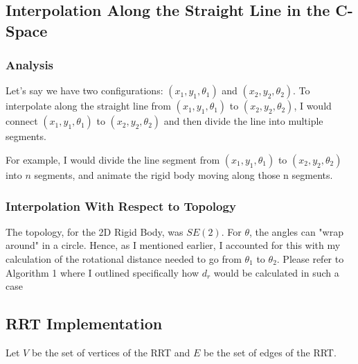 \documentclass{article}
\begin{document}
\subsection{Interpolation Along the Straight Line in the C-Space}
\subsubsection{Analysis}
Let's say we have two configurations: $(x_1, y_1, \theta_1)$ and $(x_2, y_2, \theta_2)$. To interpolate along the straight line from $(x_1, y_1, \theta_1)$ to  $(x_2, y_2, \theta_2)$, I would connect $(x_1, y_1, \theta_1)$ to  $(x_2, y_2, \theta_2)$ and then divide the line into multiple segments. \newline 

For example, I would divide the line segment from $(x_1, y_1, \theta_1)$ to  $(x_2, y_2, \theta_2)$ into $n$ segments, and animate the rigid body moving along those n segments. 

\subsubsection{Interpolation With Respect to Topology}
The topology, for the 2D Rigid Body, was $SE(2)$. For $\theta$, the angles can "wrap around" in a circle. Hence, as I mentioned earlier, I accounted for this with my calculation of the rotational distance needed to go from $\theta_1$ to $\theta_2$. Please refer to Algorithm 1 where I outlined specifically how $d_r$ would be calculated in such a case 

\subsection{RRT Implementation}

Let $V$ be the set of vertices of the RRT and $E$ be the set of edges of the RRT. 
\end{document}
